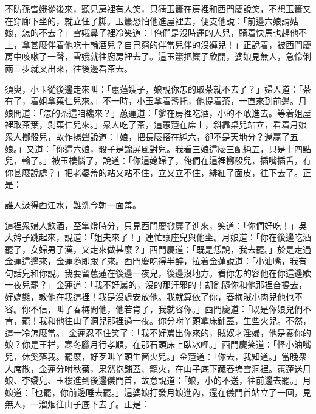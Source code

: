 不防孫雪娥從後來，聽見房裡有人笑，只猜玉簫在房裡和西門慶說笑，不想玉簫又在穿廊下坐的，就立住了脚。玉簫恐怕他進屋裡去，便支他說：「前邊六娘請姑娘，怎的不去？」雪娥鼻子裡冷笑道：{}「俺們是沒時運的人兒，{}騎着快馬也趕他不上，拿甚麼伴着他吃十輪酒兒？自己窮的伴當兒伴的沒褲兒！」正說着，被西門慶房中咳嗽了一聲，雪娥就往廚房裡去了。這玉簫把簾子欣開，婆娘見無人，急伶俐兩三步就叉出來，{}往後邊看茶去。

須臾，小玉從後邊走來叫：「蕙蓮嫂子，娘說你怎的取茶就不去了？」婦人道：「茶有了，着姐拿菓仁兒來。」不一時，小玉拿着盞托，他提着茶，一直來到前邊。月娘問道：「怎的茶這咱纔來？」蕙蓮道：「爹在房裡吃酒，小的不敢進去。{}等着姐屋裡取茶葉，剝菓仁兒來。」衆人吃了茶，這蕙蓮在席上，斜靠桌兒站立，看着月娘衆人擲骰兒，故作揚聲說道：「娘，把長麼搭在純六，卻不是天地分？還贏了五娘。」又道：「你這六娘，骰子是錦屏風對兒。我看三娘這麼三配純五，只是十四點兒，輸了。」被玉樓惱了，說道：「你這媳婦子，俺們在這裡擲骰兒，插嘴插舌，有你甚麼說處？」把老婆羞的站又站不住，立又立不住，緋紅了面皮，往下去了。{}正是：

\begin{myquote} 
誰人汲得西江水，難洗今朝一面羞。
\end{myquote} 

這裡衆婦人飲酒，至掌燈時分，只見西門慶掀簾子進來，笑道：「你們好吃！」吳大妗子跳起來，說道：「姐夫來了！」連忙讓座兒與他坐。月娘道：「你在後邊吃酒罷了，女婦男子漢，又走來做甚麼？」西門慶道：「既是恁說，我去罷。」於是走過金蓮這邊來，金蓮隨即跟了來。西門慶吃得半醉，拉着金蓮說道：「小油嘴，我有句話兒和你說。我要留蕙蓮在後邊一夜兒，後邊沒地方。看你怎的容他在你這邊歇一夜兒罷？」金蓮道：「我不好罵的，沒的那汗邪的！胡亂隨你和他那裡㒲搗去，好嬌態，教他在我這裡！我是沒處安放他。我就算依了你，春梅賊小肉兒他也不容。{}你不信，叫了春梅問他，他若肯了，我就容你。」西門慶道：「既是你娘兒們不肯，罷！我和他往山子洞兒那裡過一夜。你分咐丫頭拿床鋪蓋，生些火兒。不然，這一冷怎麼當。」金蓮忍不住笑了：「我不好罵出你來的，賊奴才淫婦，他是養你的娘？你是王祥，寒冬臘月行孝順，在那石頭床上臥冰哩。」{}西門慶笑道：「怪小油嘴兒，休奚落我。罷麼，好歹叫丫頭生箇火兒。」金蓮道：「你去，我知道。」當晚衆人席散，金蓮分咐秋菊，果然抱鋪蓋、籠火，在山子底下藏春塢雪洞裡。蕙蓮送月娘、李嬌兒、玉樓進到後邊儀門首，故意說道：「娘，小的不送，往前邊去罷。」月娘道：「也罷，你前邊睡去罷。」這婆娘打發月娘進內，還在儀門首站立了一回，見無人，{}一溜烟往山子底下去了。正是：

